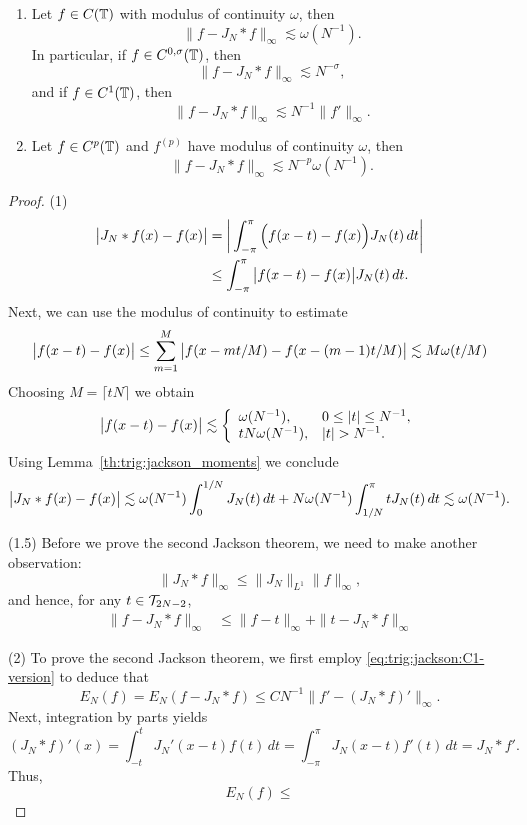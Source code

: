 \begin{theorem} \label{th:trig:jackson}
  \begin{enumerate}
  \item Let $f \in C(\mathbb{T})$ with modulus of continuity $\omega$, then
  \[
      \| f - J_N \ast f \|_\infty \lesssim \omega(N^{-1}).
  \]
  In particular, if $f \in C^{0,\sigma}(\mathbb{T})$, then
  \[
      \|f - J_N \ast f \|_\infty \lesssim N^{-\sigma},
  \]
  and if $f \in C^1(\mathbb{T})$, then
  \begin{equation} \label{eq:trig:jackson:C1-version}
    \|f - J_N \ast f \|_\infty \lesssim N^{-1} \|f'\|_\infty.
  \end{equation}
  \item Let $f \in C^p(\mathbb{T})$ and $f^{(p)}$ have modulus of continuity $\omega$,
  then
  \[
      \| f - J_N\ast f \|_\infty \lesssim N^{-p} \omega(N^{-1}).
  \]
  \end{enumerate}
\end{theorem}
\begin{proof}
  (1) 
  \begin{align*}
    \big| J_N \ast f(x) - f(x) \big|
    &=
    \bigg| \int_{-\pi}^\pi \Big( f(x-t) - f(x) \Big) J_N(t) \, dt \bigg| \\
    &\leq
    \int_{-\pi}^\pi \big|f(x-t) - f(x) \big| J_N(t) \, dt.
  \end{align*}
  Next, we can use the modulus of continuity to estimate
  \[
    \big|f(x-t) - f(x) \big| \leq \sum_{m = 1}^M
      \big| f(x - mt/M) - f(x - (m-1)t/M) \big|
    \lesssim M \omega(t/M)
  \]
  Choosing $M = \lceil tN \rceil$ we obtain
  \[
    \big|f(x-t) - f(x) \big| \lesssim
      \left\{ \begin{array}{ll} 
        \omega(N^{-1}), & 0 \leq |t| \leq N^{-1}, \\
        t N \omega(N^{-1}), & |t| > N^{-1}.
       \end{array} \right.
  \]
  Using Lemma~\ref{th:trig:jackson_moments} we conclude
  \[
    \big| J_N \ast f(x) - f(x) \big|
    \lesssim
      \omega(N^{-1}) \int_0^{1/N} J_N(t) \, dt
      + N \omega(N^{-1}) \int_{1/N}^{\pi} t J_N(t)\, dt
    \lesssim \omega(N^{-1}). 
  \]

  (1.5) Before we prove the second Jackson theorem, we need 
  to make another observation: 
  \[
    \| J_N \ast f \|_\infty 
    \leq \|J_N \|_{L^1} \|f\|_\infty,
  \]
  and hence, for any $t \in \mathcal{T}_{2N-2}$, 
  \begin{align*}
      \|f - J_N \ast f\|_\infty 
      &\leq  
      \|f - t\|_\infty + \| t - J_N \ast f \|_\infty 
  \end{align*}

  (2) To prove the second Jackson theorem, we first employ 
  \eqref{eq:trig:jackson:C1-version} to deduce that 
  \[
      E_N(f) = E_N(f - J_N \ast f) 
      \leq 
      C N^{-1} \| f' - (J_N \ast f)' \|_\infty.
  \]
  Next, integration by parts yields 
  \[
     (J_N \ast f)'(x) = \int_{-t}^t J_N'(x-t) f(t) \,dt 
     = \int_{-\pi}^\pi J_N(x-t) f'(t) \,dt 
     = J_N \ast f'.
  \]
  Thus, 
  \[
    E_N(f) \leq
  \]

\end{proof}

